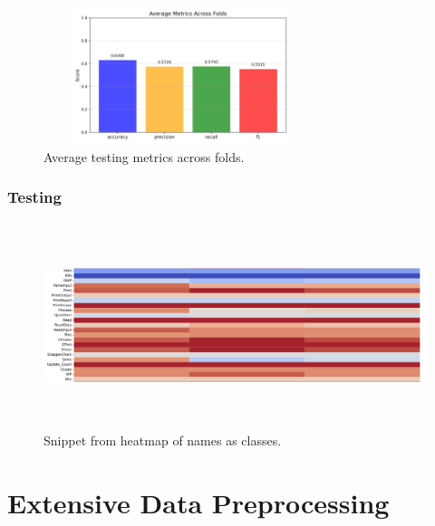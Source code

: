\documentclass[10pt,english,a4paper]{report}
\begin{document}
\begin{figure}[h!]
    \centering
    \includegraphics[width=8cm, height=4cm]{figures/testing/agg_average_metrics_plot.png} 
    \caption{Average testing metrics across folds.}
    \label{fig:average_testing_metrics}
\end{figure}


\subsubsection{Testing}

\begin{figure}[h!]
    \centering
    \includegraphics[width=16cm, height=6cm]{figures/heatmap_snippet.png} 
    \caption{Snippet from heatmap of names as classes.}
    \label{fig:func_lengths_distr_merged}
\end{figure}



\section{Extensive Data Preprocessing}




\end{document}
